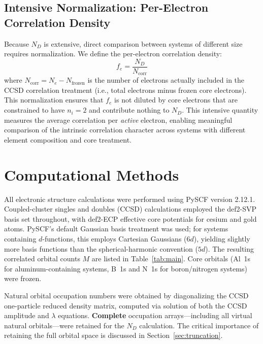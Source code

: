 \documentclass[12pt,a4paper]{article}
\begin{document}
\subsection{Intensive Normalization: Per-Electron Correlation Density}

Because $N_D$ is extensive, direct comparison between systems
of different size requires normalization. We define the per-electron
correlation density:
\begin{equation}
  f_e = \frac{N_D}{N_{\text{corr}}}
  \label{eq:fe}
\end{equation}
where $N_{\text{corr}} = N_e - N_{\text{frozen}}$ is the number of
electrons actually included in the CCSD correlation treatment
(i.e., total electrons minus frozen core electrons). This normalization
ensures that $f_e$ is not diluted by core electrons that are constrained
to have $n_i = 2$ and contribute nothing to $N_D$.
This intensive quantity measures the average correlation per
\emph{active} electron, enabling meaningful comparison of the
intrinsic correlation character across systems with different
element composition and core treatment.

\section{Computational Methods}

All electronic structure calculations were performed using PySCF
version 2.12.1.\cite{sun2018pyscf,sun2020recent}
Coupled-cluster singles and doubles (CCSD) calculations employed
the def2-SVP basis set\cite{weigend2005balanced} throughout,
with def2-ECP effective core potentials for cesium and gold atoms.
PySCF's default Gaussian basis treatment was used; for systems
containing $d$-functions, this employs Cartesian Gaussians ($6d$),
yielding slightly more basis functions than the spherical-harmonic
convention ($5d$). The resulting correlated orbital counts $M$ are
listed in Table~\ref{tab:main}.
Core orbitals (Al~1s for aluminum-containing systems, B~1s and N~1s for
boron/nitrogen systems) were frozen.

Natural orbital occupation numbers were obtained by diagonalizing
the CCSD one-particle reduced density matrix, computed via solution
of both the CCSD amplitude and $\lambda$ equations.
\textbf{Complete} occupation arrays---including all virtual natural
orbitals---were retained for the $N_D$ calculation.
The critical importance of retaining the full orbital space is
discussed in Section~\ref{sec:truncation}.
\end{document}
